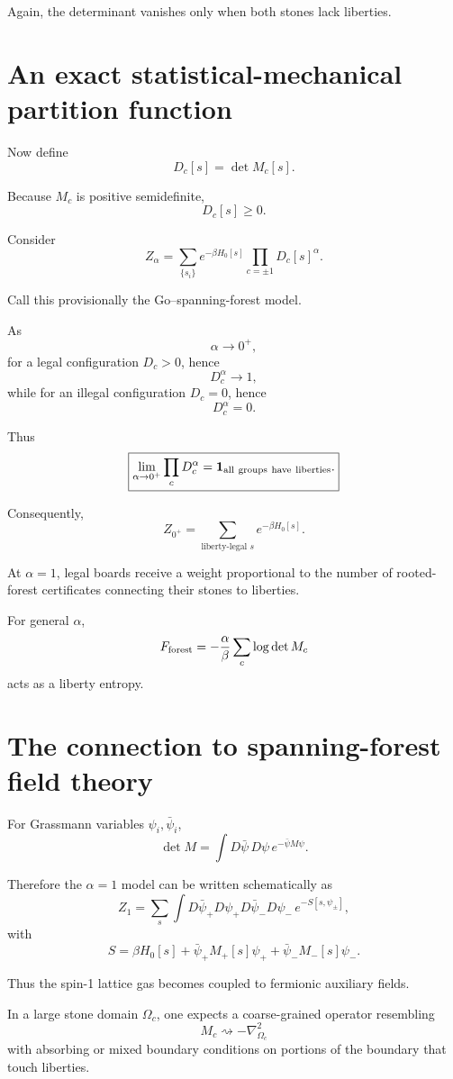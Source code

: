 \documentclass[11pt]{article}
\begin{document}
Again, the determinant vanishes only when both stones lack liberties.

\section{An exact statistical-mechanical partition function}

Now define
\[
D_c[s]=\det M_c[s].
\]

Because \(M_c\) is positive semidefinite,
\[
D_c[s]\geq0.
\]

Consider
\[
\boxed{
Z_\alpha
=
\sum_{\{s_i\}}
e^{-\beta H_0[s]}
\prod_{c=\pm1}D_c[s]^\alpha.
}
\]

Call this provisionally the Go--spanning-forest model.

As
\[
\alpha\rightarrow0^+,
\]
for a legal configuration \(D_c>0\), hence
\[
D_c^\alpha\rightarrow1,
\]
while for an illegal configuration \(D_c=0\), hence
\[
D_c^\alpha=0.
\]

Thus
\[
\boxed{
\lim_{\alpha\to0^+}
\prod_cD_c^\alpha
=
\mathbf 1_{\rm all\ groups\ have\ liberties}.
}
\]

Consequently,
\[
\boxed{
Z_{0^+}
=
\sum_{\text{liberty-legal }s}
e^{-\beta H_0[s]}.
}
\]

At \(\alpha=1\), legal boards receive a weight proportional to the number of rooted-forest certificates connecting their stones to liberties.

For general \(\alpha\),
\[
F_{\rm forest}
=
-\frac{\alpha}{\beta}
\sum_c\log\det M_c
\]
acts as a liberty entropy.

\section{The connection to spanning-forest field theory}

For Grassmann variables \(\psi_i,\bar\psi_i\),
\[
\det M
=
\int
D\bar\psi\,D\psi\,
e^{-\bar\psi M\psi}.
\]

Therefore the \(\alpha=1\) model can be written schematically as
\[
Z_1
=
\sum_s
\int
D\bar\psi_+D\psi_+
D\bar\psi_-D\psi_-
\,
e^{-S[s,\psi_\pm]},
\]
with
\[
S
=
\beta H_0[s]
+
\bar\psi_+M_+[s]\psi_+
+
\bar\psi_-M_-[s]\psi_-.
\]

Thus the spin-1 lattice gas becomes coupled to fermionic auxiliary fields.

In a large stone domain \(\Omega_c\), one expects a coarse-grained operator resembling
\[
M_c
\rightsquigarrow
-\nabla^2_{\Omega_c}
\]
with absorbing or mixed boundary conditions on portions of the boundary that touch liberties.
\end{document}
